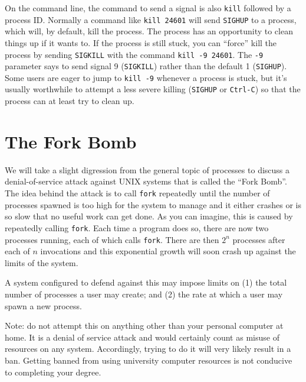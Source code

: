 On the command line, the command to send a signal is also \texttt{kill} followed by a process ID. Normally a command like \texttt{kill 24601} will send \texttt{SIGHUP} to a process, which will, by default, kill the process. The process has an opportunity to clean things up if it wants to. If the process is still stuck, you can ``force'' kill the process by sending \texttt{SIGKILL} with the command \texttt{kill -9 24601}. The \texttt{-9} parameter says to send signal 9 (\texttt{SIGKILL}) rather than the default 1 (\texttt{SIGHUP}). Some users are eager to jump to \texttt{kill -9} whenever a process is stuck, but it's usually worthwhile to attempt a less severe killing (\texttt{SIGHUP} or \texttt{Ctrl-C}) so that the process can at least try to clean up.


\section*{The Fork Bomb}

We will take a slight digression from the general topic of processes to discuss a denial-of-service attack against UNIX systems that is called the ``Fork Bomb''. The idea behind the attack is to call \texttt{fork} repeatedly until the number of processes spawned is too high for the system to manage and it either crashes or is so slow that no useful work can get done. As you can imagine, this is caused by repeatedly calling \texttt{fork}. Each time a program does so, there are now two processes running, each of which calls \texttt{fork}. There are then $2^{n}$ processes after each of $n$ invocations and this exponential growth will soon crash up against the limits of the system.

A system configured to defend against this may impose limits on (1) the total number of processes a user may create; and (2) the rate at which a user may spawn a new process.

Note: do not attempt this on anything other than your personal computer at home. It is a denial of service attack and would certainly count as misuse of resources on any system. Accordingly, trying to do it will very likely result in a ban. Getting banned from using university computer resources is not conducive to completing your degree.



